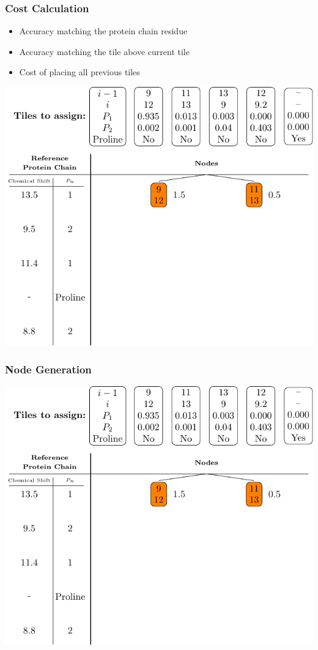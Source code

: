 \documentclass{beamer}
\begin{document}
\begin{frame}
	\frametitle{Cost Calculation}
	\begin{itemize}
		\item Accuracy matching the protein chain residue
		\vspace{12pt}
		\item Accuracy matching the tile above current tile
		\vspace{12pt}
		\item Cost of placing all previous tiles
	\end{itemize}
	\center
	\includegraphics[width=.6\textwidth]{tilePlacement/step3}
\end{frame}

\begin{frame}
	\frametitle{Node Generation}
	\vspace{-.5cm}
	\center
	\includegraphics[width=.9\textwidth]{tilePlacement/step3}
\end{frame}
\end{document}
